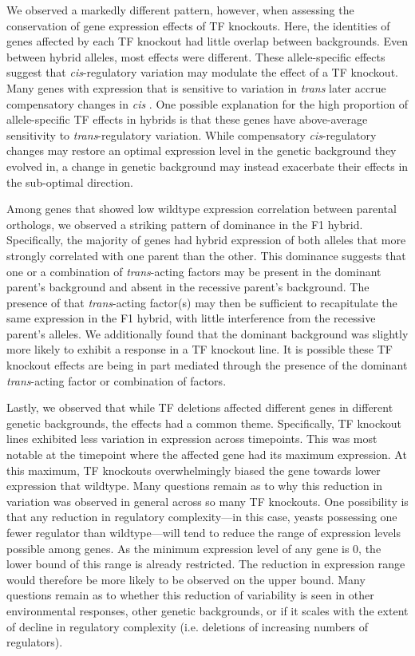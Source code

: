 We observed a markedly different pattern, however, when assessing the conservation of gene expression effects of TF knockouts. Here, the identities of genes affected by each TF knockout had little overlap between backgrounds. Even between hybrid alleles, most effects were different. These allele-specific effects suggest that \textit{cis}-regulatory variation may modulate the effect of a TF knockout. Many genes with expression that is sensitive to variation in \textit{trans} later accrue compensatory changes in \textit{cis} \cite{Metzger2017, Metzger2019, Tsouris2024}. One possible explanation for the high proportion of allele-specific TF effects in hybrids is that these genes have above-average sensitivity to \textit{trans}-regulatory variation. While compensatory \textit{cis}-regulatory changes may restore an optimal expression level in the genetic background they evolved in, a change in genetic background may instead exacerbate their effects in the sub-optimal direction.

Among genes that showed low wildtype expression correlation between parental orthologs, we observed a striking pattern of dominance in the F1 hybrid. Specifically, the majority of genes had hybrid expression of both alleles that more strongly correlated with one parent than the other. This dominance suggests that one or a combination of \textit{trans}-acting factors may be present in the dominant parent's background and absent in the recessive parent's background. The presence of that \textit{trans}-acting factor(s) may then be sufficient to recapitulate the same expression in the F1 hybrid, with little interference from the recessive parent's alleles. We additionally found that the dominant background was slightly more likely to exhibit a response in a TF knockout line. It is possible these TF knockout effects are being in part mediated through the presence of the dominant \textit{trans}-acting factor or combination of factors.

Lastly, we observed that while TF deletions affected different genes in different genetic backgrounds, the effects had a common theme. Specifically, TF knockout lines exhibited less variation in expression across timepoints. This was most notable at the timepoint where the affected gene had its maximum expression. At this maximum, TF knockouts overwhelmingly biased the gene towards lower expression that wildtype. Many questions remain as to why this reduction in variation was observed in general across so many TF knockouts. One possibility is that any reduction in regulatory complexity---in this case, yeasts possessing one fewer regulator than wildtype---will tend to reduce the range of expression levels possible among genes. As the minimum expression level of any gene is 0, the lower bound of this range is already restricted. The reduction in expression range would therefore be more likely to be observed on the upper bound. Many questions remain as to whether this reduction of variability is seen in other environmental responses, other genetic backgrounds, or if it scales with the extent of decline in regulatory complexity (i.e. deletions of increasing numbers of regulators).


